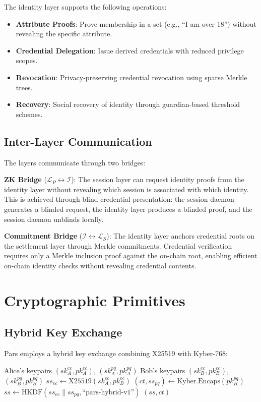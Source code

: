 \documentclass[11pt,a4paper,twocolumn]{article}
\begin{document}
The identity layer supports the following operations:
\begin{itemize}[leftmargin=*]
  \item \textbf{Attribute Proofs}: Prove membership in a set (e.g., ``I am over 18'') without revealing the specific attribute.
  \item \textbf{Credential Delegation}: Issue derived credentials with reduced privilege scopes.
  \item \textbf{Revocation}: Privacy-preserving credential revocation using sparse Merkle trees.
  \item \textbf{Recovery}: Social recovery of identity through guardian-based threshold schemes.
\end{itemize}

\subsection{Inter-Layer Communication}

The layers communicate through two bridges:

\textbf{ZK Bridge} ($\mathcal{L}_P \leftrightarrow \mathcal{I}$): The session layer can request identity proofs from the identity layer without revealing which session is associated with which identity. This is achieved through blind credential presentation: the session daemon generates a blinded request, the identity layer produces a blinded proof, and the session daemon unblinds locally.

\textbf{Commitment Bridge} ($\mathcal{I} \leftrightarrow \mathcal{L}_S$): The identity layer anchors credential roots on the settlement layer through Merkle commitments. Credential verification requires only a Merkle inclusion proof against the on-chain root, enabling efficient on-chain identity checks without revealing credential contents.

\section{Cryptographic Primitives}
\label{sec:cryptography}

\subsection{Hybrid Key Exchange}

Pars employs a hybrid key exchange combining X25519 with Kyber-768:

\begin{algorithm}[H]
\caption{Pars Hybrid Key Exchange}
\label{alg:hybrid-kex}
\begin{algorithmic}[1]
\REQUIRE Alice's keypairs $(sk_A^{ec}, pk_A^{ec})$, $(sk_A^{pq}, pk_A^{pq})$
\REQUIRE Bob's keypairs $(sk_B^{ec}, pk_B^{ec})$, $(sk_B^{pq}, pk_B^{pq})$
\STATE $ss_{ec} \gets \text{X25519}(sk_A^{ec}, pk_B^{ec})$
\STATE $(ct, ss_{pq}) \gets \text{Kyber.Encaps}(pk_B^{pq})$
\STATE $ss \gets \text{HKDF}(ss_{ec} \| ss_{pq}, \text{``pars-hybrid-v1''})$
\RETURN $(ss, ct)$
\end{algorithmic}
\end{algorithm}
\end{document}
